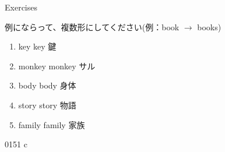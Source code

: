 \documentclass[aspectratio=169,xcolor={dvipsnames,table}]{beamer}
\newcommand{\myaudio}[1]{\href{#1}{\faVolumeUp}}
\begin{document}
\begin{frame}[plain]{Exercises}

  例にならって、複数形にしてください(例：book $\longrightarrow$ books)

  \Large

  \begin{enumerate}
    \item<1-> key \hfill{}{\scriptsize key  鍵}
    \item<1-> monkey \hfill{}{\scriptsize monkey  サル}
    \item<1-> body \hfill{}{\scriptsize body  身体}
    \item<1-> story \hfill{}{\scriptsize story  物語}
    \item<1-> family \hfill{}{\scriptsize family  家族}
  \end{enumerate}

  \hfill{\tiny 0151}\,{\scriptsize \myaudio{./audio/005_singular_plural_c.mp3}}\,{\tiny c}
\end{frame}
\end{document}
